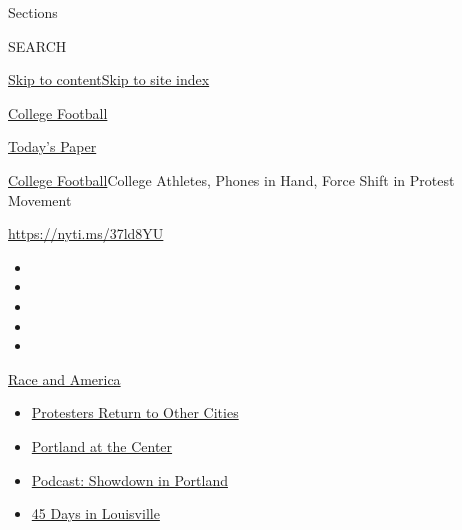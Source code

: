 Sections

SEARCH

\protect\hyperlink{site-content}{Skip to
content}\protect\hyperlink{site-index}{Skip to site index}

\href{https://www.nytimes.com/section/sports/ncaafootball}{College
Football}

\href{https://myaccount.nytimes.com/auth/login?response_type=cookie\&client_id=vi}{}

\href{https://www.nytimes.com/section/todayspaper}{Today's Paper}

\href{/section/sports/ncaafootball}{College Football}\textbar{}College
Athletes, Phones in Hand, Force Shift in Protest Movement

\url{https://nyti.ms/37ld8YU}

\begin{itemize}
\item
\item
\item
\item
\item
\end{itemize}

\href{https://www.nytimes.com/news-event/george-floyd-protests-minneapolis-new-york-los-angeles?action=click\&pgtype=Article\&state=default\&region=TOP_BANNER\&context=storylines_menu}{Race
and America}

\begin{itemize}
\tightlist
\item
  \href{https://www.nytimes.com/2020/07/26/us/protests-portland-seattle-trump.html?action=click\&pgtype=Article\&state=default\&region=TOP_BANNER\&context=storylines_menu}{Protesters
  Return to Other Cities}
\item
  \href{https://www.nytimes.com/2020/07/24/us/portland-oregon-protests-white-race.html?action=click\&pgtype=Article\&state=default\&region=TOP_BANNER\&context=storylines_menu}{Portland
  at the Center}
\item
  \href{https://www.nytimes.com/2020/07/23/podcasts/the-daily/portland-protests.html?action=click\&pgtype=Article\&state=default\&region=TOP_BANNER\&context=storylines_menu}{Podcast:
  Showdown in Portland}
\item
  \href{https://www.nytimes.com/interactive/2020/07/16/us/black-lives-matter-protests-louisville-breonna-taylor.html?action=click\&pgtype=Article\&state=default\&region=TOP_BANNER\&context=storylines_menu}{45
  Days in Louisville}
\end{itemize}

